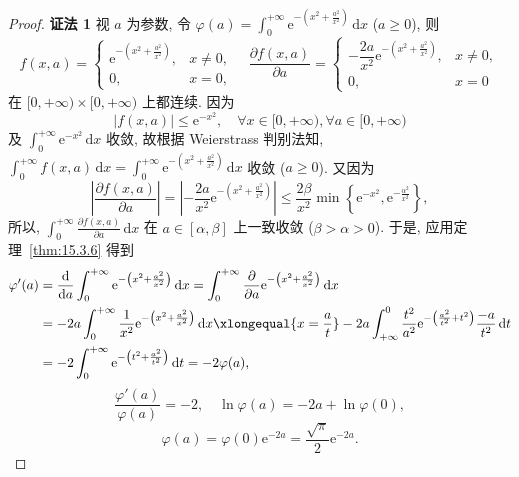 \begin{proof}
\textbf{证法 1} 视 $a$ 为参数, 令 $\varphi(a)=\displaystyle\int_{0}^{+\infty}\mathrm{e}^{-\left(x^{2}+\frac{a^{2}}{x^{2}}\right)}\,\mathrm{d}x$ ($a\geqslant0$), 则
\[
  f(x,a)=\begin{cases}
    \mathrm{e}^{-\left(x^{2}+\frac{a^{2}}{x^{2}}\right)}, & x\neq0,\\
    0, & x=0,
\end{cases}\quad
  \frac{\partial f(x,a)}{\partial a}=\begin{cases}
    -\dfrac{2a}{x^{2}}\mathrm{e}^{-\left(x^{2}+\frac{a^{2}}{x^{2}}\right)}, & x\neq0,\\
    0, & x=0
\end{cases}
\]
在 $[0,+\infty)\times[0,+\infty)$ 上都连续. 因为
\[
  |f(x,a)|\leqslant\mathrm{e}^{-x^{2}},\quad\forall x\in[0,+\infty),\forall a\in[0,+\infty)
\]
及 $\displaystyle\int_{0}^{+\infty}\mathrm{e}^{-x^{2}}\,\mathrm{d}x$ 收敛, 故根据 Weierstrass 判别法知, $\displaystyle\int_{0}^{+\infty}f(x,a)\,\mathrm{d}x=\int_{0}^{+\infty}\mathrm{e}^{-\left(x^{2}+\frac{a^{2}}{x^{2}}\right)}\,\mathrm{d}x$ 收敛 ($a\geqslant0$). 又因为
\[
  \left|\frac{\partial f(x,a)}{\partial a}\right|=\left|-\frac{2a}{x^{2}}\mathrm{e}^{-\left(x^{2}+\frac{a^{2}}{x^{2}}\right)}\right|\leqslant\frac{2\beta}{x^{2}}\min\left\{\mathrm{e}^{-x^{2}},\mathrm{e}^{-\frac{\alpha^{2}}{x^{2}}}\right\},
\]
所以, $\displaystyle\int_{0}^{+\infty}\frac{\partial f(x,a)}{\partial a}\,\mathrm{d}x$ 在 $a\in[\alpha,\beta]$ 上一致收敛 ($\beta>\alpha>0$). 于是, 应用定理~\ref{thm:15.3.6} 得到
\[
  \begin{aligned}
    \varphi'(a)&=\frac{\mathrm{d}}{\mathrm{d}a}\int_{0}^{+\infty}\mathrm{e}^{-\left(x^{2}+\frac{a^{2}}{x^{2}}\right)}\,\mathrm{d}x=\int_{0}^{+\infty}\frac{\partial}{\partial a}\mathrm{e}^{-\left(x^{2}+\frac{a^{2}}{x^{2}}\right)}\,\mathrm{d}x\\
    &=-2a\int_{0}^{+\infty}\frac{1}{x^{2}}\mathrm{e}^{-\left(x^{2}+\frac{a^{2}}{x^{2}}\right)}\,\mathrm{d}x\xlongequal{x=\frac{a}{t}}-2a\int_{+\infty}^{0}\frac{t^{2}}{a^{2}}\mathrm{e}^{-\left(\frac{a^{2}}{t^{2}}+t^{2}\right)}\frac{-a}{t^{2}}\,\mathrm{d}t\\
    &=-2\int_{0}^{+\infty}\mathrm{e}^{-\left(t^{2}+\frac{a^{2}}{t^{2}}\right)}\,\mathrm{d}t=-2\varphi(a),
  \end{aligned}
\]
\[
  \frac{\varphi'(a)}{\varphi(a)}=-2,\quad\ln\varphi(a)=-2a+\ln\varphi(0),
\]
\[
  \varphi(a)=\varphi(0)\mathrm{e}^{-2a}=\frac{\sqrt{\pi}}{2}\mathrm{e}^{-2a}.
\]


\end{proof}
